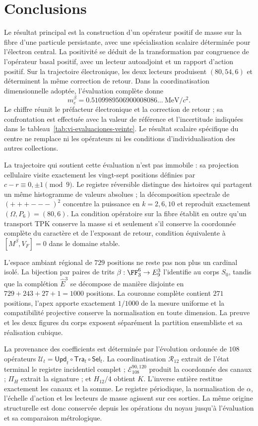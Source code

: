 \section{Conclusions}
\label{vi:sec:conclusiones}

Le résultat principal est la construction d’un opérateur positif de masse
sur la fibre d’une particule persistante, avec une spécialisation
scalaire déterminée pour l’électron central. La positivité se déduit de
la transformation par congruence de l’opérateur basal positif, avec un lecteur
autoadjoint et un rapport d’action positif. Sur la trajectoire électronique,
les deux lecteurs produisent \((80,54,6)\) et déterminent la même correction
de retour. Dans la coordinatisation dimensionnelle adoptée, l’évaluation complète donne
\[
 m_e^{\beta}=0.5109989506900008086\ldots\ \mathrm{MeV}/c^2.
\]
Le chiffre réunit le préfacteur électronique et la correction de retour ; sa
confrontation est effectuée avec la valeur de référence et l’incertitude
indiquées dans le tableau~\ref{tab:vi-evaluaciones-veinte}. Le résultat
scalaire spécifique du centre ne remplace ni les opérateurs ni les
conditions d’individualisation des autres collections.

La trajectoire qui soutient cette évaluation n’est pas immobile : sa projection
cellulaire visite exactement les vingt-sept positions définies par
$c-r\equiv0,\pm1\pmod9$. Le registre réversible distingue des histoires qui
partagent un même histogramme de valeurs absolues ; la décomposition spectrale
de $(+++---)^2$ concentre la puissance en $k=2,6,10$ et reproduit exactement
$(\Omega,P_6)=(80,6)$. La
condition opératoire sur la fibre établit en outre qu’un transport TPK
conserve la masse si et seulement s’il conserve la coordonnée complète du caractère et de
l’exposant de retour, condition équivalente à $[M^\beta,V_F]=0$ dans le domaine
stable.

L’espace ambiant régional de \(729\) positions ne reste pas non plus un cardinal
isolé. La bijection par paires de trits
\(\beta:\FF_3^6\to E_9^3\) l’identifie au corps \(S_0\), tandis
que la complétion \(\widehat E^3\) se décompose de manière disjointe en
\(729+243+27+1=1000\) positions. La couronne complète contient \(271\)
positions, l’apex apporte exactement \(1/1000\) de la mesure uniforme et
la compatibilité projective conserve la normalisation en toute dimension.
La preuve et les deux figures du corps exposent séparément la partition
ensembliste et sa réalisation cubique.

La provenance des coefficients est déterminée par l’évolution
ordonnée de \(108\) opérateurs
\(\mathcal U_t=\mathsf{Upd}_t\circ\mathsf{Tra}_t\circ\mathsf{Sel}_t\).
La coordinatisation \(\mathcal R_{12}\) extrait de l’état terminal le registre
incidentiel complet ; \(\mathcal E_{108}^{90,120}\) produit la coordonnée
des canaux ; \(\Pi_H\) extrait la signature ; et \(H_{12}/4\) obtient \(K\).
L’inverse entière restitue exactement les canaux et la somme. Le registre
périodique, la normalisation de \(\alpha\), l’échelle d’action et les
lecteurs de masse agissent sur ces sorties. La même origine structurelle
est donc conservée depuis les opérations du noyau jusqu’à
l’évaluation et sa comparaison métrologique.


